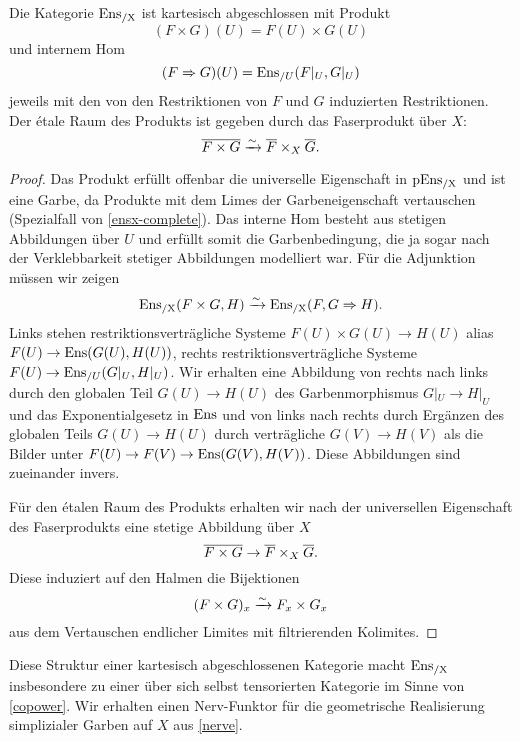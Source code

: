 \begin{prop} \label{ensx-cart-closed}
  Die Kategorie $\operatorname{Ens_{/X}}$ ist kartesisch abgeschlossen mit Produkt
  \[ (F \times G)(U) = F(U) \times G(U) \]
  und internem Hom
  \[ (F \Rightarrow G)(U) = \operatorname{Ens}_{/U}(F|_U, G|_U) \]
  jeweils mit den von den Restriktionen von $F$ und $G$ induzierten
  Restriktionen. Der étale Raum des Produkts ist gegeben durch das
  Faserprodukt über $X$:
  \[ \overline{F \times G}
     \xrightarrow[]{\sim} \overline{F} \times_X \overline{G}. \]
\end{prop}
\begin{proof}
  Das Produkt erfüllt offenbar die universelle Eigenschaft in $\operatorname{pEns_{/X}}$
  und ist eine Garbe, da Produkte mit dem Limes der Garbeneigenschaft
  vertauschen (Spezialfall von \ref{ensx-complete}). Das interne Hom
  besteht aus stetigen Abbildungen über $U$ und erfüllt somit die
  Garbenbedingung, die ja sogar nach der Verklebbarkeit stetiger
  Abbildungen modelliert war. Für die Adjunktion müssen wir zeigen
  \[ \operatorname{Ens_{/X}}(F \times G, H) \xrightarrow[]{\sim} \operatorname{Ens_{/X}}(F, G \Rightarrow H). \]
  Links stehen restriktionsverträgliche Systeme $F(U) \times G(U) \to
  H(U)$ alias $F(U) \to \operatorname{Ens}(G(U), H(U))$, rechts
  restriktionsverträgliche Systeme $F(U) \to \operatorname{Ens}_{/U}(G|_U,
  H|_U)$. Wir erhalten eine Abbildung von rechts nach links durch den
  globalen Teil $G(U) \to H(U)$ des Garbenmorphismus $G|_U \to H|_U$
  und das Exponentialgesetz in $\operatorname{Ens}$ und von links nach rechts durch
  Ergänzen des globalen Teils $G(U) \to H(U)$ durch verträgliche $G(V)
  \to H(V)$ als die Bilder unter $F(U) \to F(V) \to \operatorname{Ens}(G(V),
  H(V))$. Diese Abbildungen sind zueinander invers.

  Für den étalen Raum des Produkts erhalten wir nach der universellen
  Eigenschaft des Faserprodukts eine stetige Abbildung über $X$
  \[ \overline{F \times G}
  \to \overline{F} \times_X \overline{G}.
  \]
  Diese induziert auf den Halmen die Bijektionen
  \[ (F \times G)_x \xrightarrow[]{\sim} F_x \times G_x \]
  aus dem Vertauschen endlicher Limites mit filtrierenden Kolimites.
\end{proof}
Diese Struktur einer kartesisch abgeschlossenen Kategorie macht
$\operatorname{Ens_{/X}}$ insbesondere zu einer über sich selbst tensorierten Kategorie
im Sinne von \ref{copower}. Wir erhalten einen Nerv-Funktor für die
geometrische Realisierung simplizialer Garben auf $X$ aus \ref{nerve}.


